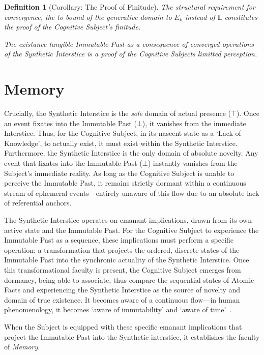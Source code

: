 \documentclass[11pt, a4paper]{article}
\theoremstyle{formalism}
\newtheorem{formalism}{Definition}
\begin{document}
\begin{formalism}[Corollary: The Proof of Finitude]
    The structural requirement for convergence, the to bound of the 
    generative domain to $E_k$ instead of $\mathbb{E}$ constitutes 
    the proof of the Cognitive Subject's finitude. 

    The existance tangible Immutable Past as a consequence of converged
    operations of the Synthetic Interstice is a proof of the Cognitive
    Subjects limitted perception.
\end{formalism}

\section{Memory}

Crucially, the Synthetic Interstice is the \textit{sole} domain of actual
presence ($\top$). Once an event fixates into the Immutable Past ($\bot$), it
vanishes from the immediate Interstice. Thus, for the Cognitive Subject, in its
nascent state as a `Lack of Knowledge', to actually exist, it must exist within
the Synthetic Interstice. Furthermore, the Synthetic Interstice is the only
domain of absolute novelty. Any event that fixates into the Immutable Past
($\bot$) instantly vanishes from the Subject's immediate reality. As long as
the Cognitive Subject is unable to perceive the Immutable Past, it remains
strictly dormant within a continuous stream of ephemeral events---entirely
unaware of this flow due to an absolute lack of referential anchors.

The Synthetic Interstice operates on emanant implications, drawn from its own
active state and the Immutable Past. For the Cognitive Subject to experience
the Immutable Past as a sequence, these implications must perform a specific
operation: a transformation that projects the ordered, discrete states of the
Immutable Past into the synchronic actuality of the Synthetic Interstice. Once
this transformational faculty is present, the Cognitive Subject emerges from
dormancy, being able to associate, thus compare the sequential states of Atomic
Facts and experiencing the Synthetic Interstice as the source of novelty and
domain of true existence. It becomes aware of a continuous flow---in human
phenomenology, it becomes `aware of immutability' and `aware of
time'~\cite{Husserl1928}.

When the Subject is equipped with these specific emanant implications that
project the Immutable Past into the Synthetic interstice, it establishes
the faculty of \textit{Memory}.
\end{document}
